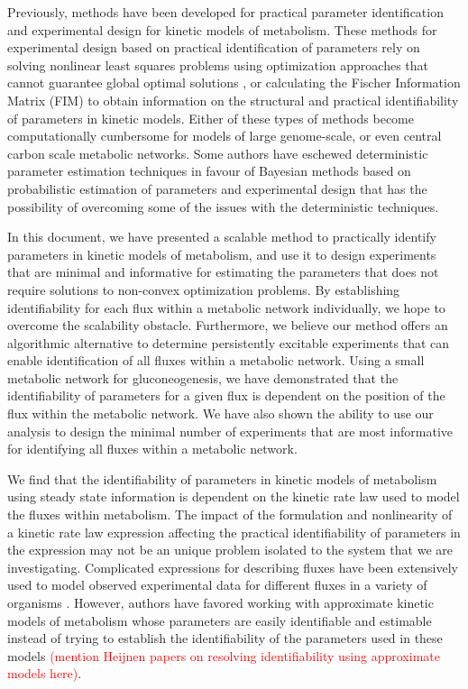 \documentclass[10pt]{article}
\begin{document}
	Previously, methods have been developed for practical parameter identification and experimental design for kinetic models of metabolism. These methods for experimental design based on practical identification of parameters rely on solving nonlinear least squares problems using optimization approaches that cannot guarantee global optimal solutions \parencite{Raue2009a}, or calculating the Fischer Information Matrix (FIM) to obtain information on the structural and practical identifiability of parameters in kinetic models. Either of these types of methods become computationally cumbersome for models of large genome-scale, or even central carbon scale metabolic networks. Some authors have eschewed deterministic parameter estimation techniques in favour of Bayesian methods based on probabilistic estimation of parameters and experimental design \parencite{Saa2016, Saa2016a} that has the possibility of overcoming some of the issues with the deterministic techniques. 	
	 
	In this document, we have presented a scalable method to practically identify parameters in kinetic models of metabolism, and use it to design experiments that are minimal and informative for estimating the parameters that does not require solutions to non-convex optimization problems. By establishing identifiability for each flux within a metabolic network individually, we hope to overcome the scalability obstacle. Furthermore, we believe our method offers an algorithmic alternative to determine persistently excitable experiments that can enable identification of all fluxes within a metabolic network. Using a small metabolic network for gluconeogenesis, we have demonstrated that the identifiability of parameters for a given flux is dependent on the position of the flux within the metabolic network. We have also shown the ability to use our analysis to design the minimal number of experiments that are most informative for identifying all fluxes within a metabolic network.
	
	We find that the identifiability of parameters in kinetic models of metabolism using steady state information is dependent on the kinetic rate law used to model the fluxes within metabolism. The impact of the formulation and nonlinearity of a kinetic rate law expression affecting the practical identifiability of parameters in the expression may not be an unique problem isolated to the system that we are investigating. Complicated expressions for describing fluxes have been extensively used to model observed experimental data for different fluxes in a variety of organisms \parencite{Chassagnole2002a, Peskov2012, VanHeerden2014}. However, authors have favored working with approximate kinetic models of metabolism whose parameters are easily identifiable and estimable instead of trying to establish the identifiability of the parameters used in these models \textcolor{red}{(mention Heijnen papers on resolving identifiability using approximate models here)}.	
	
\end{document}
